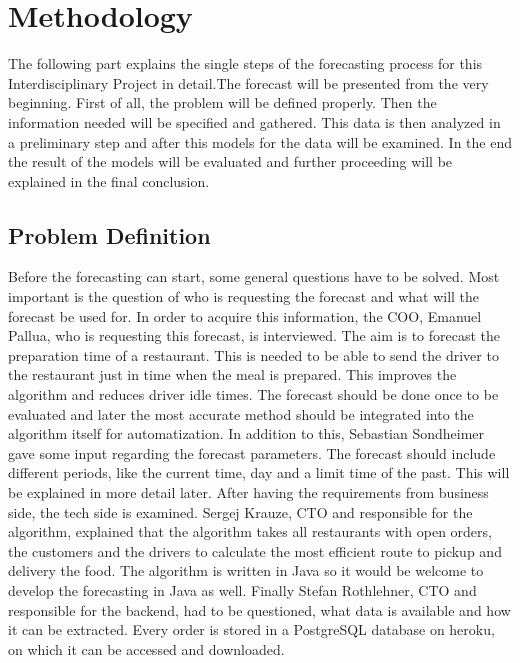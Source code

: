 \chapter{Methodology}\label{chapter:Methodology}
The following part explains the single steps of the forecasting process for this Interdisciplinary Project in detail.The forecast will be presented from the very beginning.\newline
First of all, the problem will be defined properly. Then the information needed will be specified and gathered. This data is then analyzed in a preliminary step and after this models for the data will be examined. In the end the result of the models will be evaluated and further proceeding will be explained in the final conclusion.
\section{Problem Definition}\label{section:Problem Definition}
Before the forecasting can start, some general questions have to be solved. Most important is the question of who is requesting the forecast and what will the forecast be used for. In order to acquire this information, the COO, Emanuel Pallua, who is requesting this forecast, is interviewed. The aim is to forecast the preparation time of a restaurant. This is needed to be able to send the driver to the restaurant just in time when the meal is prepared. This improves the algorithm and reduces driver idle times. The forecast should be done once to be evaluated and later the most accurate method should be integrated into the algorithm itself for automatization. In addition to this, Sebastian Sondheimer gave some input regarding the forecast parameters. The forecast should include different periods, like the current time, day and a limit time of the past. This will be explained in more detail later.\newline
After having the requirements from business side, the tech side is examined. Sergej Krauze, CTO and responsible for the algorithm, explained that the algorithm takes all restaurants with open orders, the customers and the drivers to calculate the most efficient route to pickup and delivery the food. The algorithm is written in Java so it would be welcome to develop the forecasting in Java as well. Finally Stefan Rothlehner, CTO and responsible for the backend, had to be questioned, what data is available and how it can be extracted. Every order is stored in a PostgreSQL database on heroku, on which it can be accessed and downloaded.
